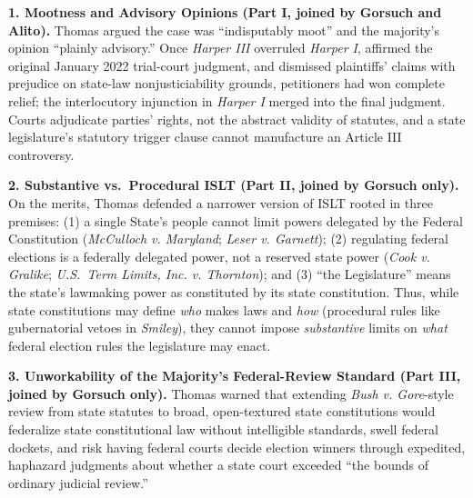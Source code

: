 \documentclass[12pt]{article}
\begin{document}
\textbf{1. Mootness and Advisory Opinions (Part I, joined by Gorsuch and Alito).} Thomas argued the case was ``indisputably moot'' and the majority's opinion ``plainly advisory.'' Once \textit{Harper III} overruled \textit{Harper I}, affirmed the original January 2022 trial-court judgment, and dismissed plaintiffs' claims with prejudice on state-law nonjusticiability grounds, petitioners had won complete relief; the interlocutory injunction in \textit{Harper I} merged into the final judgment. Courts adjudicate parties' rights, not the abstract validity of statutes, and a state legislature's statutory trigger clause cannot manufacture an Article III controversy.

\textbf{2. Substantive vs.\ Procedural ISLT (Part II, joined by Gorsuch only).} On the merits, Thomas defended a narrower version of ISLT rooted in three premises: (1) a single State's people cannot limit powers delegated by the Federal Constitution (\textit{McCulloch v. Maryland}; \textit{Leser v. Garnett}); (2) regulating federal elections is a federally delegated power, not a reserved state power (\textit{Cook v. Gralike}; \textit{U.S.\ Term Limits, Inc. v. Thornton}); and (3) ``the Legislature'' means the state's lawmaking power as constituted by its state constitution. Thus, while state constitutions may define \textit{who} makes laws and \textit{how} (procedural rules like gubernatorial vetoes in \textit{Smiley}), they cannot impose \textit{substantive} limits on \textit{what} federal election rules the legislature may enact.

\textbf{3. Unworkability of the Majority's Federal-Review Standard (Part III, joined by Gorsuch only).} Thomas warned that extending \textit{Bush v. Gore}-style review from state statutes to broad, open-textured state constitutions would federalize state constitutional law without intelligible standards, swell federal dockets, and risk having federal courts decide election winners through expedited, haphazard judgments about whether a state court exceeded ``the bounds of ordinary judicial review.''
\end{document}
